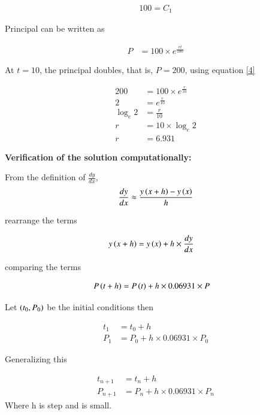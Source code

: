 \documentclass[journal]{IEEEtran}
\numberwithin{equation}{enumi}
\numberwithin{figure}{enumi}
\begin{document}
\begin{align}
    100 = C_1
\end{align}

Principal can be written as

\begin{align}
    P &= 100 \times e^{\frac{rt}{100}} \label{4}
\end{align}

At $t = 10$, the principal doubles, that is, $P = 200$, using equation \eqref{4}

\begin{align}
    200 &= 100 \times e^{\frac{r}{10}}\\
    2 &= e^{\frac{r}{10}}\\
    \log_e{2} &= \frac{r}{10}\\
    r &= 10 \times \log_e{2}\\
    r &= 6.931
\end{align}


\textbf{Verification of the solution computationally:}

From the definition of $\frac{dy}{dx}$,
\begin{align}
    \frac{dy}{dx} \approx \frac{y\left(x + h\right) - y\left(x\right)}{h}
\end{align}

rearrange the terms 

\begin{align}
    y\left(x + h\right) &= y\left(x\right) + h \times \frac{dy}{dx}
\end{align}

comparing the terms

\begin{align}
    P\left(t + h\right) &= P\left(t\right) + h \times 0.06931 \times P
\end{align}

Let $\left(t_0, P_0\right)$ be the initial conditions then 

\begin{align}
    t_1 &= t_0 + h\\
    P_1 &= P_0 + h \times 0.06931 \times P_0 \label{equa}
\end{align}

Generalizing this 

\begin{align}
    t_{n+1} &= t_{n}+h \\
    P_{n+1} &= P_{n}+h \times 0.06931 \times P_n
\end{align}
Where h is step and is small.
\end{document}
